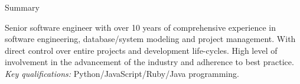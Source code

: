 \documentclass[]{mcdowellcv}
\begin{document}
    \makeheader
    \label{Contact}

    \begin{cvsection}{Summary}
        \label{Summary}
        \begin{cvsubsection}{}{}{}
            Senior software engineer with over 10 years of comprehensive experience in software engineering, {database}/system modeling and project management. With direct control over entire projects and development life-cycles. High level of involvement in the advancement of the industry and adherence to best practice.\\
            \textit{Key qualifications:} Python/JavaScript/Ruby/Java programming.
        \end{cvsubsection}
    \end{cvsection}
\end{document}
